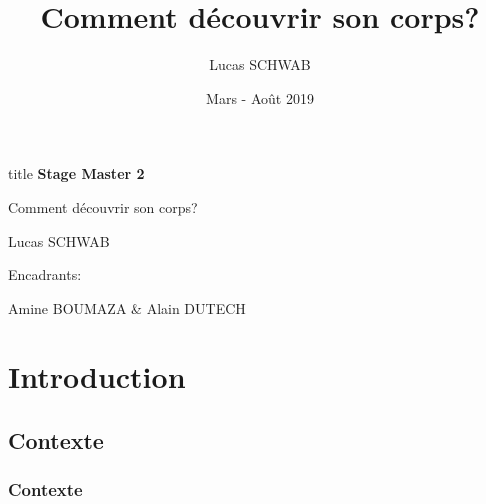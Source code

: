 \documentclass[french]{beamer}
\title{Comment découvrir son corps?}
\author{Lucas SCHWAB}
\date{Mars - Août 2019}
\begin{document}
\begin{frame}
    \begin{center}
        \begin{beamercolorbox}[sep=8pt,center]{title}
            \Huge \textbf{Stage Master 2}

            \huge Comment découvrir son corps?
        \end{beamercolorbox}
        \vfill

        Lucas SCHWAB

        \vfill

        Encadrants:

        Amine BOUMAZA
        \&
        Alain DUTECH
    \end{center}
\end{frame}


\begin{frame}
    \hfill
    \parbox[t]{.88\textwidth}{
        \begin{minipage}[c][0.75\textheight]{0.88\textwidth}
        \tableofcontents
        \end{minipage}
    }
\end{frame}

\section{Introduction}

\subsection{Contexte}

\begin{frame}
    \frametitle{Contexte}

\end{frame}

\end{document}
